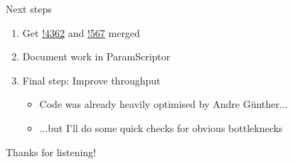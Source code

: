 \documentclass[xcolor={dvipsnames}]{beamer}
\begin{document}
\begin{frame}{Next steps}
  \vspace{0.0cm}
  \begin{enumerate}
    \setlength\itemsep{2.0em}
    \item{Get \href{https://gitlab.cern.ch/lhcb/Rec/-/merge_requests/4362}{!4362} and \href{https://gitlab.cern.ch/lhcb-datapkg/PRConfig/-/merge_requests/567}{!567} merged}
    \item{Document work in ParamScriptor}
    \item{Final step: Improve throughput}
    \begin{itemize}
      \item{Code was already heavily optimised by Andre G{\"u}nther...}
      \item{...but I'll do some quick checks for obvious bottleknecks}
    \end{itemize}
  \end{enumerate}
  \vspace{0.3cm}
  \begin{center}
    \Huge Thanks for listening!
  \end{center}
\end{frame}
\end{document}
